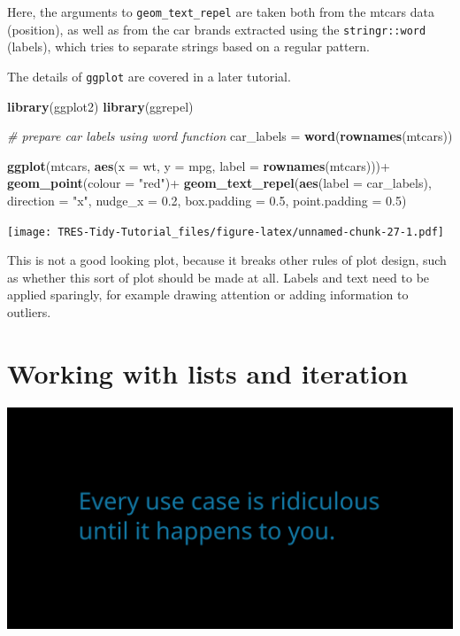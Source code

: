 \documentclass[]{book}
\newenvironment{Shaded}{}{}
\newcommand{\CommentTok}[1]{\textcolor[rgb]{0.38,0.63,0.69}{\textit{#1}}}
\newcommand{\DataTypeTok}[1]{\textcolor[rgb]{0.56,0.13,0.00}{#1}}
\newcommand{\FloatTok}[1]{\textcolor[rgb]{0.25,0.63,0.44}{#1}}
\newcommand{\KeywordTok}[1]{\textcolor[rgb]{0.00,0.44,0.13}{\textbf{#1}}}
\newcommand{\NormalTok}[1]{#1}
\newcommand{\OperatorTok}[1]{\textcolor[rgb]{0.40,0.40,0.40}{#1}}
\newcommand{\StringTok}[1]{\textcolor[rgb]{0.25,0.44,0.63}{#1}}
\begin{document}
Here, the arguments to \texttt{geom\_text\_repel} are taken both from the mtcars data (position), as well as from the car brands extracted using the \texttt{stringr::word} (labels), which tries to separate strings based on a regular pattern.

The details of \texttt{ggplot} are covered in a later tutorial.

\begin{Shaded}
\begin{Highlighting}[]
\KeywordTok{library}\NormalTok{(ggplot2)}
\KeywordTok{library}\NormalTok{(ggrepel)}

\CommentTok{# prepare car labels using word function}
\NormalTok{car_labels =}\StringTok{ }\KeywordTok{word}\NormalTok{(}\KeywordTok{rownames}\NormalTok{(mtcars))}

\KeywordTok{ggplot}\NormalTok{(mtcars,}
       \KeywordTok{aes}\NormalTok{(}\DataTypeTok{x =}\NormalTok{ wt, }\DataTypeTok{y =}\NormalTok{ mpg,}
           \DataTypeTok{label =} \KeywordTok{rownames}\NormalTok{(mtcars)))}\OperatorTok{+}
\StringTok{  }\KeywordTok{geom_point}\NormalTok{(}\DataTypeTok{colour =} \StringTok{"red"}\NormalTok{)}\OperatorTok{+}
\StringTok{  }\KeywordTok{geom_text_repel}\NormalTok{(}\KeywordTok{aes}\NormalTok{(}\DataTypeTok{label =}\NormalTok{ car_labels),}
                  \DataTypeTok{direction =} \StringTok{"x"}\NormalTok{,}
                  \DataTypeTok{nudge_x =} \FloatTok{0.2}\NormalTok{,}
                  \DataTypeTok{box.padding =} \FloatTok{0.5}\NormalTok{,}
                  \DataTypeTok{point.padding =} \FloatTok{0.5}\NormalTok{)}
\end{Highlighting}
\end{Shaded}

\texttt{[image: TRES-Tidy-Tutorial\_files/figure-latex/unnamed-chunk-27-1.pdf]}

This is not a good looking plot, because it breaks other rules of plot design, such as whether this sort of plot should be made at all. Labels and text need to be applied sparingly, for example drawing attention or adding information to outliers.

\hypertarget{working-with-lists-and-iteration}{%
\chapter{Working with lists and iteration}\label{working-with-lists-and-iteration}}

\includegraphics{opening-image.png}
\end{document}

